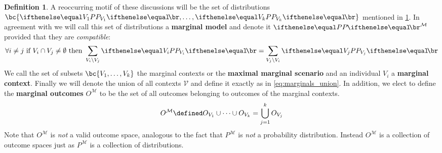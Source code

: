 \documentclass[aps, 10pt, english, twoside, pra, nofootinbib, longbibliography]{revtex4-1}
\theoremstyle{plain}
\theoremstyle{definition}
\newtheorem{definition}[theorem]{Definition}
\theoremstyle{remark}
\newcommand{\term}[1]{\textcolor{Mahogany}{\textbf{#1}}}
\begin{document}
    \begin{definition}
        \label{def:marginal_model}
        A reoccurring motif of these discussions will be the set of distributions $\bc{\prob[V_1], \ldots, \prob[V_k]}$ mentioned in \cref{def:marginal_model}. In agreement with \cite{Fritz_2011} we will call this set of distributions a \term{marginal model} and denote it $\prob^\mathcal{M}$ provided that they are \textit{compatible}:
        \[ \forall i \neq j \text{ if } V_i \cap V_j \neq \emptyset \text{ then } \sum_{V_i \setminus V_j} \prob[V_i] = \sum_{V_j \setminus V_i} \prob[V_j]  \]
        We call the set of subsets $\bc{V_1, \ldots, V_k}$ the marginal contexts or the \term{maximal marginal scenario}  and an individual $V_i$ a \term{marginal context}. Finally we will denote the union of all contexts $\mathcal{V}$ and define it exactly as in \cref{eq:marginals_union}. In addition, we elect to define the \term{marginal outcomes} $O^\mathcal{M}$ to be the set of all outcomes belonging to outcomes of the marginal contexts.
        \[ O^\mathcal{M} \defined O_{V_1} \cup \cdots \cup O_{V_k} = \bigcup_{j=1}^{k} O_{V_j} \]
        Note that $O^\mathcal{M}$ is \textit{not} a valid outcome space, analogous to the fact that $P^\mathcal{M}$ is \textit{not} a probability distribution. Instead $O^\mathcal{M}$ is a collection of outcome spaces just as $P^\mathcal{M}$ is a collection of distributions.
    \end{definition}

\end{document}
